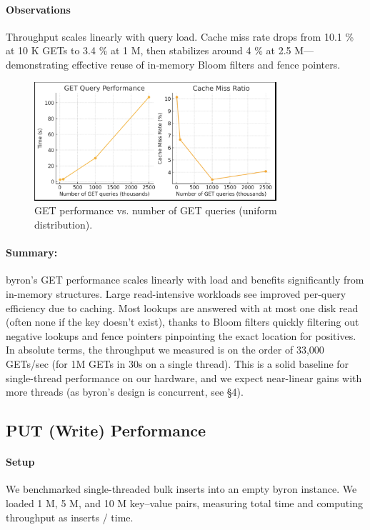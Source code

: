 \documentclass[10pt]{article}
\begin{document}
\paragraph{Observations}
Throughput scales linearly with query load. Cache miss rate drops from 10.1 \% at 10 K GETs to 3.4 \% at 1 M, then stabilizes around 4 \% at 2.5 M—demonstrating effective reuse of in‐memory Bloom filters and fence pointers.

\begin{figure}[htbp]
  \centering
  \includegraphics[width=0.8\textwidth]{get_performance.png}
  \caption{GET performance vs. number of GET queries (uniform distribution).}
  \label{fig:get_performance}
\end{figure}

\paragraph{Summary:} byron’s GET performance scales linearly with load and benefits significantly from in-memory structures. Large read-intensive workloads see improved per-query efficiency due to caching. Most lookups are answered with at most one disk read (often none if the key doesn’t exist), thanks to Bloom filters quickly filtering out negative lookups and fence pointers pinpointing the exact location for positives. In absolute terms, the throughput we measured is on the order of 33,000 GETs/sec (for 1M GETs in 30s on a single thread). This is a solid baseline for single-thread performance on our hardware, and we expect near-linear gains with more threads (as byron’s design is concurrent, see §4).

\subsection{PUT (Write) Performance}

\paragraph{Setup}
We benchmarked single-threaded bulk inserts into an empty byron instance.
We loaded 1 M, 5 M, and 10 M key–value pairs, measuring total time and computing throughput as inserts / time.
\end{document}
